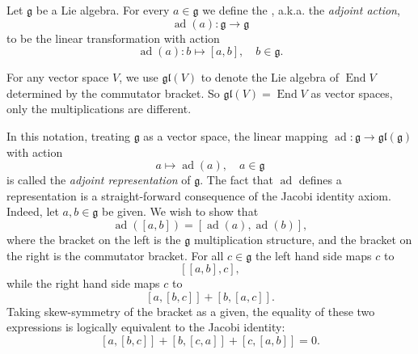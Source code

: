 \documentclass[12pt]{article}
\begin{document}
\newcommand{\lag}{\mathfrak{g}}
\DeclareMathOperator{\ad}{ad}
\DeclareMathOperator{\End}{End}


Let $\lag$ be a Lie algebra.  For every $a\in\lag$ we define the
, a.k.a. the {\em adjoint action},
$$\ad(a):\lag\rightarrow\lag$$
to be the linear transformation with
action
$$\ad(a): b\mapsto [a,b],\quad b\in\lag.$$

For any vector space $V$, we use $\mathfrak{gl}(V)$ to denote the Lie algebra 
of $\End V$ determined by the commutator bracket.  So 
$\mathfrak{gl}(V)=\End V$ as vector spaces, only the multiplications are different.  

In this notation, treating $\mathfrak{g}$ as a vector space, the linear mapping $\ad:\lag\rightarrow \mathfrak{gl}(\lag)$ with action $$a\mapsto \ad(a),\quad a\in\lag$$
is called the {\em adjoint representation} of $\lag$.  The fact that
$\ad$ defines a representation is a straight-forward consequence of
the Jacobi identity axiom.  Indeed, let $a,b\in \lag$ be given.  We
wish to show that
$$\ad([a,b]) = [\ad(a),\ad(b)],$$
where the bracket on the left is the
$\lag$ multiplication structure, and the bracket on the right is the
commutator bracket.  For all $c\in\lag$ the left hand side maps $c$ to
$$[[a,b],c],$$
while the right hand side maps $c$ to
$$[a,[b,c]]+[b,[a,c]].$$
Taking skew-symmetry of the bracket as a
given, the equality of these two expressions is logically equivalent
to the Jacobi identity:
$$[a,[b,c]] +[b,[c,a]] + [c,[a,b]] = 0.$$
\end{document}
